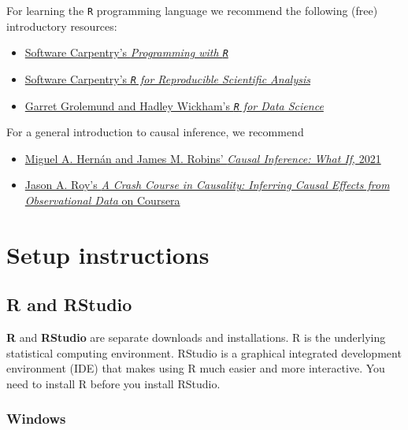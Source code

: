 \documentclass[
  12pt, krantz2,
]{krantz}
\newcommand{\passthrough}[1]{#1}
\providecommand{\tightlist}{%
  \setlength{\itemsep}{0pt}\setlength{\parskip}{0pt}}
\theoremstyle{definition}
\theoremstyle{definition}
\theoremstyle{definition}
\newcommand{\1}{\mathbbm{1}}
\begin{document}
For learning the \passthrough{\lstinline!R!} programming language we recommend the following (free)
introductory resources:

\begin{itemize}
\tightlist
\item
  \href{http://swcarpentry.github.io/r-novice-inflammation/}{Software Carpentry's \emph{Programming with
  \passthrough{\lstinline!R!}}}
\item
  \href{http://swcarpentry.github.io/r-novice-gapminder/}{Software Carpentry's \emph{\passthrough{\lstinline!R!} for Reproducible Scientific
  Analysis}}
\item
  \href{https://r4ds.had.co.nz}{Garret Grolemund and Hadley Wickham's \emph{\passthrough{\lstinline!R!} for Data
  Science}}
\end{itemize}

For a general introduction to causal inference, we recommend

\begin{itemize}
\tightlist
\item
  \href{https://www.hsph.harvard.edu/miguel-hernan/causal-inference-book/}{Miguel A. Hernán and James M. Robins' \emph{Causal Inference: What If},
  2021}
\item
  \href{https://www.coursera.org/learn/crash-course-in-causality}{Jason A. Roy's \emph{A Crash Course in Causality: Inferring Causal Effects from
  Observational Data} on
  Coursera}
\end{itemize}

\hypertarget{setup}{%
\section{Setup instructions}\label{setup}}

\hypertarget{r-and-rstudio}{%
\subsection{R and RStudio}\label{r-and-rstudio}}

\textbf{R} and \textbf{RStudio} are separate downloads and installations. R is the
underlying statistical computing environment. RStudio is a graphical integrated
development environment (IDE) that makes using R much easier and more
interactive. You need to install R before you install RStudio.

\hypertarget{windows}{%
\subsubsection{Windows}\label{windows}}
\end{document}
